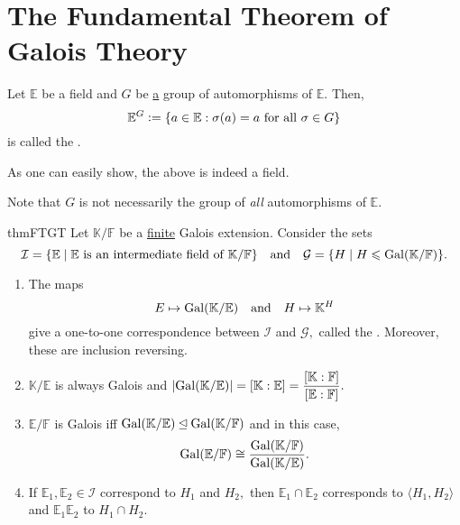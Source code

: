 \section{The Fundamental Theorem of Galois Theory}
\begin{defn}%
    Let $\mathbb{E}$ be a field and $G$ be \underline{a} group of automorphisms of $\mathbb{E}.$ Then,
    \begin{equation*} 
        \mathbb{E}^G \vcentcolon= \{a \in \mathbb{E} : \sigma(a) = a \text{ for all } \sigma \in G\}
    \end{equation*}
    is called the .
\end{defn}
\begin{rem}
    As one can easily show, the above is indeed a field. 

    Note that $G$ is not necessarily the group of \emph{all} automorphisms of $\mathbb{E}.$
\end{rem}

\begin{restatable}{thm}{FTGT}
\label{thm:FTGT}
    Let $\mathbb{K}/\mathbb{F}$ be a \underline{finite} Galois extension. Consider the sets
    \begin{equation*} 
        \mathcal{I} = \{\mathbb{E} \mid \mathbb{E} \text{ is an intermediate field of }\mathbb{K}/\mathbb{F}\} \quad\text{and}\quad \mathcal{G} = \{H \mid H \leqslant \operatorname{Gal}(\mathbb{K}/\mathbb{F})\}.
    \end{equation*}
    \begin{enumerate}
         \item \label{item:G1} The maps 
         \begin{equation*} 
             E \mapsto \operatorname{Gal}(\mathbb{K}/\mathbb{E}) \quad\text{and}\quad H \mapsto \mathbb{K}^H
         \end{equation*}
         give a one-to-one correspondence between $\mathcal{I}$ and $\mathcal{G},$ called the . Moreover, these are inclusion reversing.
         \item \label{item:G3} $\mathbb{K}/\mathbb{E}$ is always Galois and ${\left\lvert \operatorname{Gal}(\mathbb{K}/\mathbb{E}) \right\lvert} = [\mathbb{K} : \mathbb{E}] = \dfrac{[\mathbb{K} : \mathbb{F}]}{[\mathbb{E} : \mathbb{F}]}.$
         \item \label{item:G2} $\mathbb{E}/\mathbb{F}$ is Galois iff $\operatorname{Gal}(\mathbb{K}/\mathbb{E}) \unlhd \operatorname{Gal}(\mathbb{K}/\mathbb{F})$ and in this case,
         \begin{equation*} 
             \operatorname{Gal}(\mathbb{E}/\mathbb{F}) \cong \frac{\operatorname{Gal}(\mathbb{K}/\mathbb{F})}{\operatorname{Gal}(\mathbb{K}/\mathbb{E})}.
         \end{equation*}
         \item \label{item:G5} If $\mathbb{E}_1, \mathbb{E}_2 \in \mathcal{I}$ correspond to $H_1$ and $H_2,$ then $\mathbb{E}_1 \cap \mathbb{E}_2$ corresponds to $\langle H_1, H_2\rangle$ and $\mathbb{E}_1\mathbb{E}_2$ to $H_1 \cap H_2.$
     \end{enumerate} \hfill\hyperref[thm:FTGT2]{\downsym}
\end{restatable}

